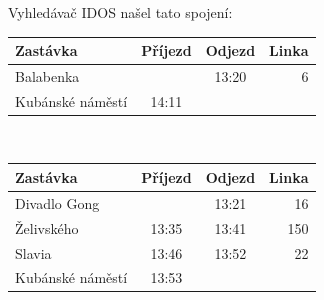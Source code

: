Vyhledávač IDOS našel tato spojení:\\[2mm]
\begin{tabular}{|l|c|c|r|}\hline
{\bf Zastávka}&{\bf Příjezd}&{\bf Odjezd}&{\bf Linka}\\\hline
Balabenka&&13:20&6\\\hline
Kubánské náměstí&14:11&&\\\hline
\end{tabular} \\[2mm]
\begin{tabular}{|l|c|c|r|}\hline
{\bf Zastávka}&{\bf Příjezd}&{\bf Odjezd}&{\bf Linka}\\\hline
Divadlo Gong&&13:21&16\\\hline
Želivského&13:35&13:41&150\\\hline
Slavia&13:46&13:52&22\\\hline
Kubánské náměstí&13:53&&\\\hline
\end{tabular} 

